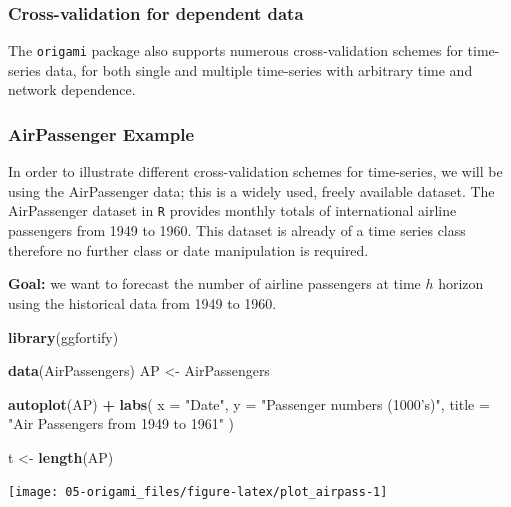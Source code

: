 \documentclass[12pt, krantz2,]{krantz}
\newenvironment{Shaded}{\begin{snugshade}}{\end{snugshade}}
\newcommand{\DataTypeTok}[1]{\textcolor[rgb]{0.27,0.27,0.27}{#1}}
\newcommand{\KeywordTok}[1]{\textcolor[rgb]{0.27,0.27,0.27}{\textbf{#1}}}
\newcommand{\NormalTok}[1]{#1}
\newcommand{\OperatorTok}[1]{\textcolor[rgb]{0.43,0.43,0.43}{\textbf{#1}}}
\newcommand{\StringTok}[1]{\textcolor[rgb]{0.5,0.5,0.5}{#1}}
\theoremstyle{definition}
\theoremstyle{definition}
\theoremstyle{definition}
\newcommand{\1}{\mathbbm{1}}
\begin{document}
\hypertarget{cross-validation-for-dependent-data}{%
\subsubsection{Cross-validation for dependent data}\label{cross-validation-for-dependent-data}}

The \texttt{origami} package also supports numerous cross-validation schemes for
time-series data, for both single and multiple time-series with arbitrary time
and network dependence.

\hypertarget{airpassenger-example}{%
\subsubsection*{AirPassenger Example}\label{airpassenger-example}}


In order to illustrate different cross-validation schemes for time-series, we
will be using the AirPassenger data; this is a widely used, freely available
dataset. The AirPassenger dataset in \texttt{R} provides monthly totals of
international airline passengers from 1949 to 1960. This dataset is already of a
time series class therefore no further class or date manipulation is required.

\textbf{Goal:} we want to forecast the number of airline passengers at time \(h\)
horizon using the historical data from 1949 to 1960.

\begin{Shaded}
\begin{Highlighting}[]
\KeywordTok{library}\NormalTok{(ggfortify)}

\KeywordTok{data}\NormalTok{(AirPassengers)}
\NormalTok{AP <-}\StringTok{ }\NormalTok{AirPassengers}

\KeywordTok{autoplot}\NormalTok{(AP) }\OperatorTok{+}
\StringTok{  }\KeywordTok{labs}\NormalTok{(}
    \DataTypeTok{x =} \StringTok{"Date"}\NormalTok{,}
    \DataTypeTok{y =} \StringTok{"Passenger numbers (1000's)"}\NormalTok{,}
    \DataTypeTok{title =} \StringTok{"Air Passengers from 1949 to 1961"}
\NormalTok{  )}

\NormalTok{t <-}\StringTok{ }\KeywordTok{length}\NormalTok{(AP)}
\end{Highlighting}
\end{Shaded}

\begin{center}\texttt{[image: 05-origami\_files/figure-latex/plot\_airpass-1]} \end{center}
\end{document}
